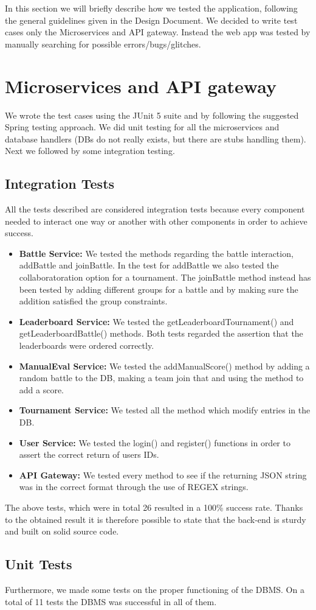 In this section we will briefly describe how we tested the application, following the general guidelines given in the Design Document.
We decided to write test cases only the Microservices and API gateway. Instead the web app was tested by manually searching for possible errors/bugs/glitches.

\section{Microservices and API gateway}
We wrote the test cases using the JUnit 5 suite and by following the suggested Spring testing approach. We did unit testing for all the microservices and database handlers (DBs do not really exists, but there are stubs handling them). Next we followed by some integration testing.

\subsection{Integration Tests}
All the tests described are considered integration tests because every component needed to interact one way or another with other components in order to achieve success.
\begin{itemize}
    \item \textbf{Battle Service:} We tested the methods regarding the battle interaction, addBattle and joinBattle. In the test for addBattle we also tested the collaboratoration option for a tournament. The joinBattle method instead has been tested by adding different groups for a battle and by making sure the addition satisfied the group constraints.
    \item \textbf{Leaderboard Service:} We tested the getLeaderboardTournament() and getLeaderboardBattle() methods. Both tests regarded the assertion that the leaderboards were ordered correctly.
    \item \textbf{ManualEval Service:} We tested the addManualScore() method by adding a random battle to the DB, making a team join that and using the method to add a score.
    \item \textbf{Tournament Service:} We tested all the method which modify entries in the DB.
    \item \textbf{User Service:} We tested the login() and register() functions in order to assert the correct return of users IDs.
    \item \textbf{API Gateway:} We tested every method to see if the returning JSON string was in the correct format through the use of REGEX strings.
\end{itemize}
The above tests, which were in total 26 resulted in a 100\%  success rate. Thanks to the obtained result it is therefore possible to state that the back-end is sturdy and built on solid source code.

\subsection{Unit Tests}
Furthermore, we made some tests on the proper functioning of the DBMS. On a total of 11 tests the DBMS was successful in all of them.